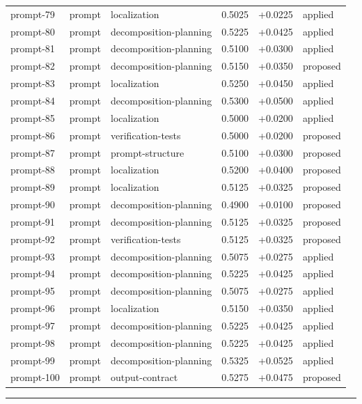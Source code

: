 \begin{center}
\begin{longtable}{llp{5.2cm}rrl}
prompt-79 & prompt & localization & 0.5025 & +0.0225 & applied \\
prompt-80 & prompt & decomposition-planning & 0.5225 & +0.0425 & applied \\
prompt-81 & prompt & decomposition-planning & 0.5100 & +0.0300 & applied \\
prompt-82 & prompt & decomposition-planning & 0.5150 & +0.0350 & proposed \\
prompt-83 & prompt & localization & 0.5250 & +0.0450 & applied \\
prompt-84 & prompt & decomposition-planning & 0.5300 & +0.0500 & applied \\
prompt-85 & prompt & localization & 0.5000 & +0.0200 & applied \\
prompt-86 & prompt & verification-tests & 0.5000 & +0.0200 & proposed \\
prompt-87 & prompt & prompt-structure & 0.5100 & +0.0300 & proposed \\
prompt-88 & prompt & localization & 0.5200 & +0.0400 & proposed \\
prompt-89 & prompt & localization & 0.5125 & +0.0325 & proposed \\
prompt-90 & prompt & decomposition-planning & 0.4900 & +0.0100 & proposed \\
prompt-91 & prompt & decomposition-planning & 0.5125 & +0.0325 & proposed \\
prompt-92 & prompt & verification-tests & 0.5125 & +0.0325 & proposed \\
prompt-93 & prompt & decomposition-planning & 0.5075 & +0.0275 & applied \\
prompt-94 & prompt & decomposition-planning & 0.5225 & +0.0425 & applied \\
prompt-95 & prompt & decomposition-planning & 0.5075 & +0.0275 & applied \\
prompt-96 & prompt & localization & 0.5150 & +0.0350 & applied \\
prompt-97 & prompt & decomposition-planning & 0.5225 & +0.0425 & applied \\
prompt-98 & prompt & decomposition-planning & 0.5225 & +0.0425 & applied \\
prompt-99 & prompt & decomposition-planning & 0.5325 & +0.0525 & applied \\
prompt-100 & prompt & output-contract & 0.5275 & +0.0475 & proposed \\
\bottomrule\end{longtable}\end{center}
\par\bigskip\hrule\bigskip

